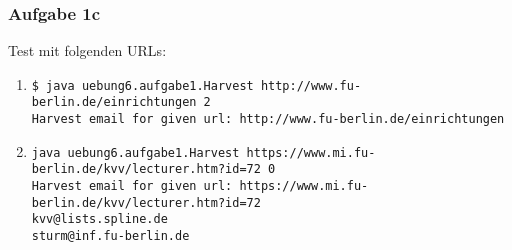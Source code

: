 \subsubsection*{Aufgabe 1c}
Test mit folgenden URLs:

\begin{enumerate}
	\item
\begin{verbatim}
$ java uebung6.aufgabe1.Harvest http://www.fu-berlin.de/einrichtungen 2
Harvest email for given url: http://www.fu-berlin.de/einrichtungen
\end{verbatim}

	\item
\begin{verbatim}
java uebung6.aufgabe1.Harvest https://www.mi.fu-berlin.de/kvv/lecturer.htm?id=72 0
Harvest email for given url: https://www.mi.fu-berlin.de/kvv/lecturer.htm?id=72
kvv@lists.spline.de
sturm@inf.fu-berlin.de
\end{verbatim}

\end{enumerate}
